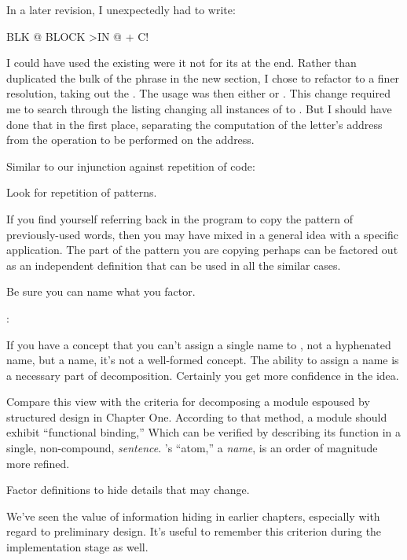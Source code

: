 In a later revision, I unexpectedly had to write:

\begin{Code}
BLK @ BLOCK  >IN @ +  C!
\end{Code}
I could have used the existing  were it not for its
 at the end. Rather than duplicated the bulk of the phrase
in the new section, I chose to refactor  to a finer
resolution, taking out the .  The usage was then either
 or . This change required me to
search through the listing changing all instances of  to
.  But I should have done that in the first place,
separating the computation of the letter's address from the operation
to be performed on the address.

Similar to our injunction against repetition of code:

\begin{tip}
Look for repetition of patterns.
\end{tip}
If you find yourself referring back in the program to copy the pattern
of previously-used words, then you may have mixed in a general idea
with a specific application. The part of the pattern you are copying
perhaps can be factored out as an independent definition that can be
used in all the similar cases.

\begin{tip}
Be sure you can name what you factor.
\end{tip}

\medbreak
\begin{interview}
:
\begin{tfquot}
If you have a concept that you can't assign a single name to , not a
hyphenated name, but a name, it's not a well-formed concept. The
ability to assign a name is a necessary part of decomposition.
Certainly you get more confidence in the idea.
\end{tfquot}
\end{interview}
Compare this view with the criteria for decomposing a module espoused
by structured design in Chapter One. According to that method, a module
should exhibit ``functional binding,'' Which can be verified by
describing its function in a single, non-compound, \emph{sentence}.
\Forth{}'s ``atom,'' a \emph{name}, is an order of magnitude more
refined.

\begin{tip}
Factor definitions to hide details that may change.
\end{tip}
We've seen the value of information hiding in earlier chapters,
especially with regard to preliminary design. It's useful to remember
this criterion during the implementation stage as well.

